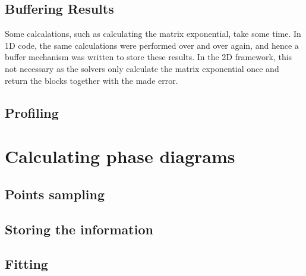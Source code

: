 
\subsection{Buffering Results}

Some calcalations, such as calculating the matrix exponential, take some time. In 1D code, the same calculations were performed over and over again, and hence a buffer mechanism was written to store these results. In the 2D framework, this not necessary as the solvers only calculate the matrix exponential once and return the blocks together with the made error.


\subsection{Profiling}


\section{Calculating phase diagrams} \label{sec:phase_diag}

\subsection{Points sampling}

\subsection{Storing the information}

\subsection{Fitting}\label{subsec:qphasediag}

